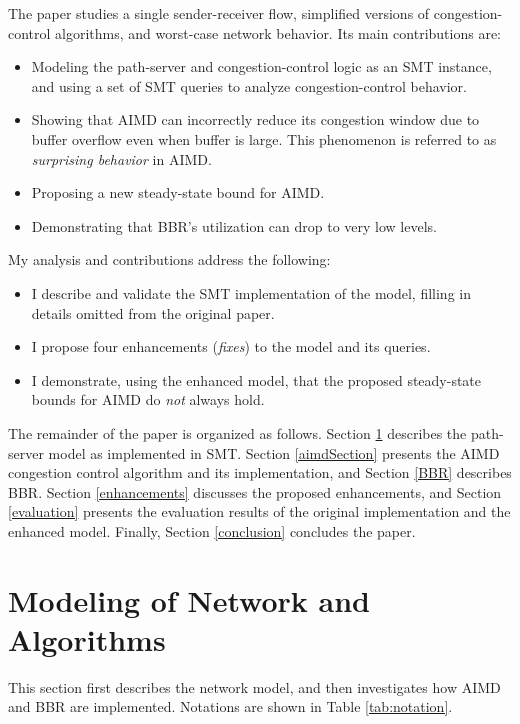 \documentclass[12pt]{l4dc2023}
\begin{document}
The paper studies a single sender-receiver flow, simplified versions of congestion-control algorithms, and worst-case network behavior. Its main contributions are:
\begin{itemize}
  \item Modeling the path-server and congestion-control logic as an SMT instance, and using a set of SMT queries to analyze congestion-control behavior.
  \item Showing that AIMD can incorrectly reduce its congestion window due to buffer overflow even when buffer is large. This phenomenon is referred to as \textit{surprising behavior} in AIMD.
  \item Proposing a new steady-state bound for AIMD.
  \item Demonstrating that BBR's utilization can drop to very low levels.
\end{itemize}

My analysis and contributions address the following:
\begin{itemize}
  \item I describe and validate the SMT implementation of the model, filling in details omitted from the original paper.
  \item I propose four enhancements (\textit{fixes}) to the model and its queries.
  \item I demonstrate, using the enhanced model, that the proposed steady-state bounds for AIMD do \emph{not} always hold.
\end{itemize}

The remainder of the paper is organized as follows. Section \ref{network} describes the path-server model as implemented in SMT. Section \ref{aimdSection} presents the AIMD congestion control algorithm and its implementation, and Section \ref{BBR} describes BBR. Section \ref{enhancements} discusses the proposed enhancements, and Section \ref{evaluation} presents the evaluation results of the original implementation and the enhanced model. Finally, Section \ref{conclusion} concludes the paper.

  
\section{Modeling of Network and Algorithms} \label{network}

This section first describes the network model, and then investigates how AIMD and BBR are implemented. Notations are shown in Table \ref{tab:notation}. 
\end{document}
